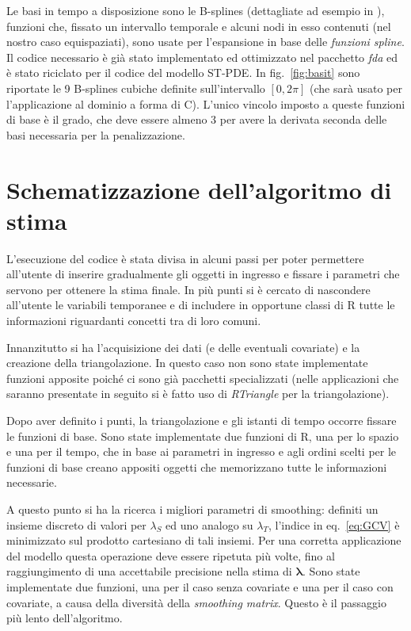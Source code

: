 \documentclass[a4paper,11pt,twoside,openright]{book}							%
\begin{document}
Le basi in tempo a disposizione sono le B-splines (dettagliate ad esempio in \cite{art:ramsaysilverman}), funzioni che, fissato un intervallo temporale e alcuni nodi in esso contenuti (nel nostro caso equispaziati), sono usate per l'espansione in base delle \textit{funzioni spline}. Il codice necessario è già stato implementato ed ottimizzato nel pacchetto \textit{fda} ed è stato riciclato per il codice del modello ST-PDE. In fig.~\ref{fig:basit} sono riportate le 9 B-splines cubiche definite sull'intervallo $[0,2\pi]$ (che sarà usato per l'applicazione al dominio a forma di C). L'unico vincolo imposto a queste funzioni di base è il grado, che deve essere almeno 3 per avere la derivata seconda delle basi necessaria per la penalizzazione.

\section{Schematizzazione dell'algoritmo di stima}
L'esecuzione del codice è stata divisa in alcuni passi per poter permettere all'utente di inserire gradualmente gli oggetti in ingresso e fissare i parametri che servono per ottenere la stima finale. In più punti si è cercato di nascondere all'utente le variabili temporanee e di includere in opportune classi di R tutte le informazioni riguardanti concetti tra di loro comuni. 

Innanzitutto si ha l'acquisizione dei dati (e delle eventuali covariate) e la creazione della triangolazione. In questo caso non sono state implementate funzioni apposite poiché ci sono già pacchetti specializzati (nelle applicazioni che saranno presentate in seguito si è fatto uso di \textit{RTriangle} per la triangolazione).

Dopo aver definito i punti, la triangolazione e gli istanti di tempo occorre fissare le funzioni di base. Sono state implementate due funzioni di R, una per lo spazio e una per il tempo, che in base ai parametri in ingresso e agli ordini scelti per le funzioni di base creano appositi oggetti che memorizzano tutte le informazioni necessarie.  

A questo punto si ha la ricerca i migliori parametri di smoothing: definiti un insieme discreto di valori per $\lambda_S$ ed uno analogo su $\lambda_T$, l'indice in eq.~\ref{eq:GCV} è minimizzato sul prodotto cartesiano di tali insiemi. Per una corretta applicazione del modello questa operazione deve essere ripetuta più volte, fino al raggiungimento di una accettabile precisione nella stima di $\bm{\lambda}$. Sono state implementate due funzioni, una per il caso senza covariate e una per il caso con covariate, a causa della diversità della \textit{smoothing matrix}. Questo è il passaggio più lento dell'algoritmo.
\end{document}
